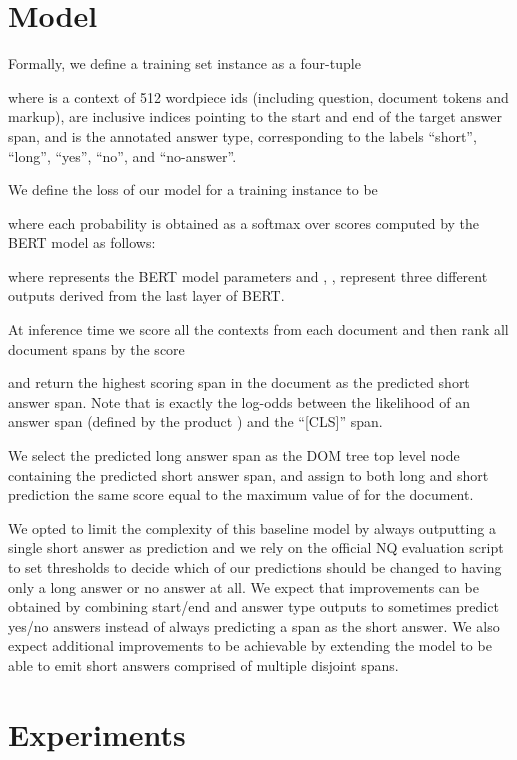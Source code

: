 \documentclass[11pt,a4paper]{article}
\begin{document}
\section{Model}

Formally, we define a training set instance as a four-tuple
   
where  is a context of 512 wordpiece ids (including question, document tokens and markup),  are inclusive indices pointing to the start and end of the target answer span, and  is the annotated answer type, corresponding to the labels ``short'', ``long'', ``yes'', ``no'', and ``no-answer''.

We define the loss of our model for a training instance to be

where each probability  is obtained as a softmax over scores computed by the BERT model as follows:

where  represents the BERT model parameters and , ,  represent three different outputs derived from the last layer of BERT.

At inference time we score all the contexts from each document and then rank all document spans  by the score

and return the highest scoring span in the document as the predicted short answer span. Note that  is exactly the log-odds between the likelihood of an answer span (defined by the product ) and the ``[CLS]'' span.

We select the predicted long answer span as the DOM tree top level node containing the predicted short answer span, and assign to both long and short prediction the same score equal to the maximum value of  for the document.

We opted to limit the complexity of this baseline model by always outputting a single short answer as prediction and we rely on the official NQ evaluation script to set thresholds to decide which of our predictions should be changed to having only a long answer or no answer at all. We expect that improvements can be obtained by combining start/end and answer type outputs to sometimes predict yes/no answers instead of always predicting a span as the short answer. We also expect additional improvements to be achievable by extending the model to be able to emit short answers comprised of multiple disjoint spans.

\section{Experiments}
\end{document}
